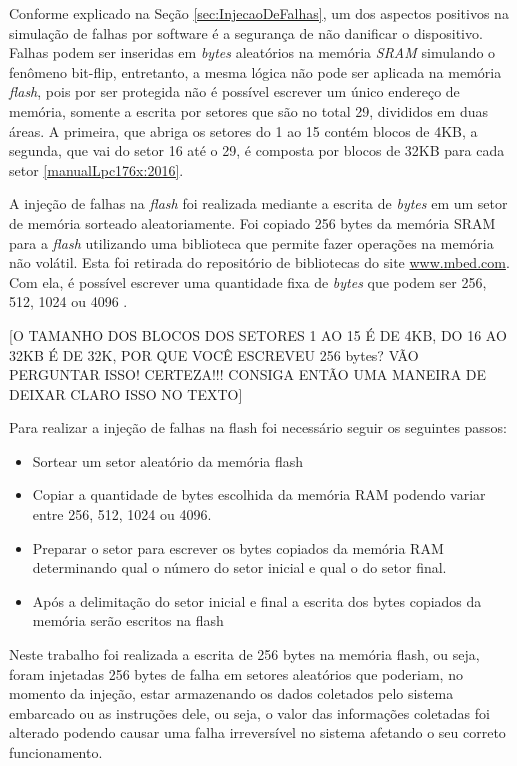 Conforme explicado na Seção \ref{sec:InjecaoDeFalhas}, um dos aspectos positivos na simulação de falhas por software é a segurança de não danificar o dispositivo. Falhas podem ser inseridas em \textit{bytes} aleatórios na memória \textit{SRAM} simulando o fenômeno bit-flip, entretanto, a mesma lógica não pode ser aplicada na memória \textit{flash}, pois por ser protegida não é possível escrever um único endereço de memória, somente a escrita por setores que são no total 29, divididos em duas áreas. A primeira, que abriga os setores do 1 ao 15 contém blocos de 4KB, a segunda, que vai do setor 16 até o 29, é composta por blocos de 32KB para cada setor \ref{manualLpc176x:2016}.

A injeção de falhas na \textit{flash} foi realizada mediante a escrita de \textit{bytes} em um setor de memória sorteado aleatoriamente. Foi copiado 256 bytes da memória SRAM para a \textit{flash} utilizando uma biblioteca que permite fazer operações na memória não volátil. Esta foi retirada do repositório de bibliotecas do site \url{www.mbed.com}. Com ela, é possível escrever uma quantidade fixa de \textit{bytes} que podem ser 256, 512, 1024 ou 4096 \cite{escritaNaFlash:2016}.

[O TAMANHO DOS BLOCOS DOS SETORES 1 AO 15 É DE 4KB, DO 16 AO 32KB É DE 32K, POR QUE VOCÊ ESCREVEU 256 bytes? VÃO PERGUNTAR ISSO! CERTEZA!!! CONSIGA ENTÃO UMA MANEIRA DE DEIXAR CLARO ISSO NO TEXTO]

Para realizar a injeção de falhas na flash foi necessário seguir os seguintes passos:

\begin{itemize}
	\item Sortear um setor aleatório da memória flash
	
	\item Copiar a quantidade de bytes escolhida da memória RAM podendo variar entre 256, 512, 1024 ou 4096.
	
	\item Preparar o setor para escrever os bytes copiados da memória RAM determinando qual o número do setor inicial e qual o do setor final.
	
	\item Após a delimitação do setor inicial e final a escrita dos bytes copiados da memória serão escritos na flash
	
\end{itemize}

Neste trabalho foi realizada a escrita de 256 bytes na memória flash, ou seja, foram injetadas 256 bytes de falha em setores aleatórios que poderiam, no momento da injeção, estar armazenando os dados coletados pelo sistema embarcado ou as instruções dele, ou seja, o valor das informações coletadas foi alterado podendo causar uma falha irreversível no sistema afetando o seu correto funcionamento.

